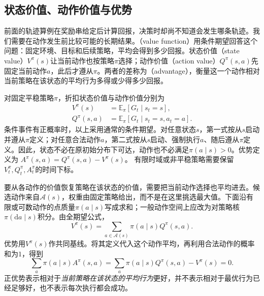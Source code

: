 \subsection{状态价值、动作价值与优势}
\label{sec:rl-overview-value-functions}

前面的轨迹算例在奖励串给定后计算回报，决策时却尚不知道会发生哪条轨迹。我们需要在动作发生前比较可能的长期结果。（value function）用条件期望回答这个问题：固定环境、目标和后续策略，平均会得到多少回报。状态价值（state value）$V^\pi(s)$让当前动作也按策略$\pi$选择；动作价值（action value）$Q^\pi(s,a)$先固定当前动作$a$，此后才遵从$\pi$。两者的差称为（advantage），衡量这一个动作相对当前策略在该状态的平均行为多得或少得多少回报。

\begin{definition}
  \label{def:rl-overview-values}
  对固定平稳策略$\pi$，折扣状态价值与动作价值分别为
  \begin{equation}
  \begin{aligned}
    V^\pi(s)&=\mathbb E_\pi[G_t\mid s_t=s],\\
    Q^\pi(s,a)&=\mathbb E_\pi[G_t\mid s_t=s,a_t=a].
  \end{aligned}
  \label{eq:rl-overview-values}
  \end{equation}
  条件事件有正概率时，以上采用通常的条件期望。对任意状态$s$，第一式按从$s$启动并遵从$\pi$定义；对任意合法动作$a$，第二式按从$s$启动、强制执行$a$、随后遵从$\pi$定义。因此，状态不必在原初始分布下可达，动作也不必满足$\pi(a\mid s)>0$。优势定义为
  $A^\pi(s,a)=Q^\pi(s,a)-V^\pi(s)$。
  有限时域或非平稳策略需要保留$V_t^\pi,Q_t^\pi,A_t^\pi$的时间下标。
\end{definition}

要从各动作的价值恢复策略在该状态的价值，需要把当前动作选择也平均进去。候选动作来自$\mathcal A(s)$，权重由固定策略给出，而不是在这里挑选最大值。下面沿有限或可数动作的点质量$\pi(a\mid s)$写成求和；一般动作空间上应改为对策略核$\pi(\mathrm da\mid s)$积分。由全期望公式，
\begin{equation}
  V^\pi(s)=\sum_{a\in\mathcal A(s)}\pi(a\mid s)Q^\pi(s,a).
  \label{eq:rl-overview-vq}
\end{equation}
优势用$V^\pi(s)$作共同基线。将其定义代入这个动作平均，再利用合法动作的概率和为$1$，得到
\[
  \sum_a\pi(a\mid s)A^\pi(s,a)
  =\sum_a\pi(a\mid s)Q^\pi(s,a)-V^\pi(s)=0.
\]
正优势表示相对于\emph{当前策略在该状态的平均行为}更好，并不表示相对于最优行为已经足够好，也不表示每次执行都会成功。

